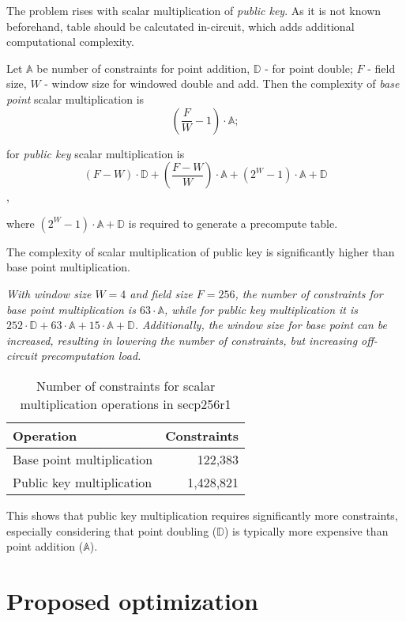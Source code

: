 \documentclass{iacrtrans}
\begin{document}
The problem rises with scalar multiplication of \textit{public key}. As it is not known beforehand, table should be calcutated in-circuit, which 
adds additional computational complexity.


Let $\mathbb{A}$ be number of constraints for point addition, $\mathbb{D}$ - for point double; $F$ - field size,
 $W$ - window size for windowed double and add.
Then the complexity of
\textit{base point} scalar multiplication is 
\[(\dfrac{F}{W} - 1) \cdot \mathbb{A};\]

for \textit{public key} scalar multiplication is 
\[(F - W) \cdot \mathbb{D} + (\dfrac{F - W}{W}) \cdot \mathbb{A} + (2 ^ W - 1) \cdot \mathbb{A} + \mathbb{D}\],

where $(2 ^ W - 1) \cdot \mathbb{A} + \mathbb{D}$ is required to generate a precompute table.


The complexity of scalar multiplication of public key is significantly higher than base point multiplication.


\textit{
With window size $W = 4$ and field size $F = 256$, the number of constraints for base point multiplication is
$63 \cdot \mathbb{A}$, while for public key multiplication it is $252 \cdot \mathbb{D} + 63 \cdot \mathbb{A} + 15 \cdot \mathbb{A} + \mathbb{D}$.
Additionally, the window size for \textit{base point} can be increased, resulting in lowering the number of constraints, but increasing off-circuit 
precomputation load.
}

\begin{table}[h]
\centering
\begin{tabular}{lr}
\hline
\textbf{Operation} & \textbf{Constraints} \\
\hline
Base point multiplication & 122,383 \\
Public key multiplication & 1,428,821 \\
\hline
\end{tabular}
\caption{Number of constraints for scalar multiplication operations in secp256r1}
\label{tab:constraints}
\end{table}

This shows that public key multiplication requires significantly more constraints, especially considering that point doubling ($\mathbb{D}$)
is typically more expensive than point addition ($\mathbb{A}$).


\section{Proposed optimization}
\end{document}
